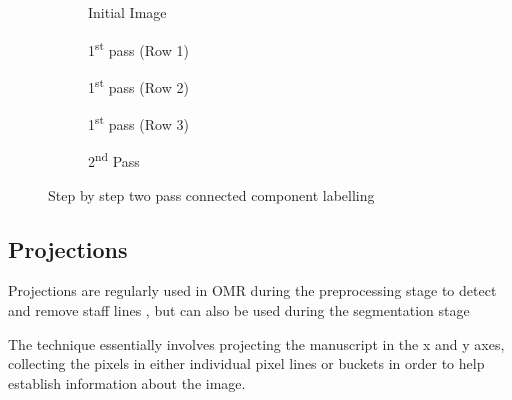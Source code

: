\begin{figure}[h!]
    \centering
    \begin{subfigure}[b]{\linewidth}
        \centering
        
        \caption{Initial Image}
    \end{subfigure}

    \vspace*{0.5in}

    \begin{subfigure}[b]{.3\linewidth}
        \centering
        
        \caption{1\textsuperscript{st} pass (Row 1)}
    \end{subfigure}
    \begin{subfigure}[b]{.3\linewidth}
        \centering
        
        \caption{1\textsuperscript{st} pass (Row 2)}
    \end{subfigure}
    \begin{subfigure}[b]{.3\linewidth}
        \centering
        
        \caption{1\textsuperscript{st} pass (Row 3)}
    \end{subfigure}

    \vspace*{0.5in}
    
    \begin{subfigure}[b]{.6\linewidth}
        \centering
        
        \caption{2\textsuperscript{nd} Pass}
    \end{subfigure}

  \caption{Step by step two pass connected component labelling}
  \label{fig:ccl-two-pass}
\end{figure}


\subsection{Projections}

Projections are regularly used in OMR during the preprocessing stage to detect and remove staff lines \parencite{rossant2002global}, but can also be used during the segmentation stage

The technique essentially involves projecting the manuscript in the x and y axes, collecting the pixels in either individual pixel lines or buckets in order to help establish information about the image.

